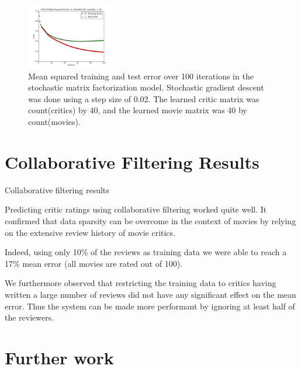 \documentclass[12pt]{article}
\newcommand{\plotwidth}{0.34}
\begin{document}
\begin{figure}[H]
	\includegraphics[width=\plotwidth\textwidth]{plots/test-i100d40l10.png}
	\caption{Mean squared training and test error over 100 iterations in the stochastic matrix factorization model. Stochastic gradient descent was done using a step size of 0.02. The learned critic matrix was count(critics) by 40, and the learned movie matrix was 40 by count(movies).}
	\label{fig:40}
	\end{figure}

\section{Collaborative Filtering Results}


Collaborative filtering results

Predicting critic ratings using collaborative filtering worked quite well. It confirmed that data sparsity can be overcome in the context of movies by relying on the extensive review history of movie critics.

Indeed, using only 10\% of the reviews as training data we were able to reach a 17\% mean error (all movies are rated out of 100).

We furthermore observed that restricting the training data to critics having written a large number of reviews did not have any significant effect on the mean error. Thus the system can be made more performant by ignoring at least half of the reviewers.


\section{Further work}
\end{document}
